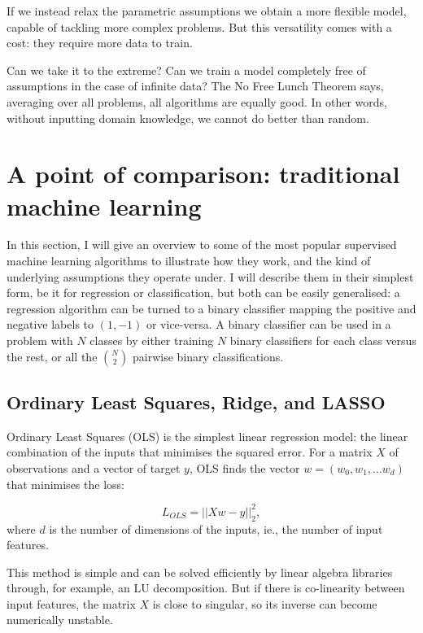 If we instead relax the parametric assumptions we obtain a more flexible model, capable of tackling more complex problems.
But this versatility comes with a cost: they require more data to train.

\begin{center}
\end{center}


Can we take it to the extreme?
Can we train a model completely free  of assumptions in the case of infinite data? The No Free Lunch Theorem \citep{no_free_lunch} says, averaging over all problems, all algorithms are equally good.
In other words, without inputting domain knowledge, we cannot do better than random.

\section[Traditional machine learning]{A point of comparison: traditional machine learning}
In this section, I will give an overview to some of the most popular supervised machine learning algorithms to illustrate how they work, and the kind of underlying assumptions they operate under.
I will describe them in their simplest form, be it for regression or classification, but both can be easily generalised: a regression algorithm can be turned to a binary classifier mapping the positive and negative labels to $(1, -1)$ or vice-versa.
A binary classifier can be used in a problem with $N$ classes by either training $N$ binary classifiers for each class versus the rest, or all the $\binom{N}{2}$ pairwise binary classifications.

\subsection{Ordinary Least Squares, Ridge, and LASSO}
Ordinary Least Squares (OLS) is the simplest linear regression model: the linear combination of the inputs that minimises the squared error.
For a matrix $X$ of observations and a vector of target $y$, OLS finds the vector $w = (w_0, w_1, ... w_d)$ that minimises the loss:

\[ L_{OLS} = || X w -y ||_2 ^2, \]
where $d$ is the number of dimensions of the inputs, ie., the number of input features.

This method is simple and can be solved efficiently by linear algebra libraries through, for example, an LU decomposition.
But if there is co-linearity between input features, the matrix $X$ is close to singular, so its inverse can become numerically unstable.

